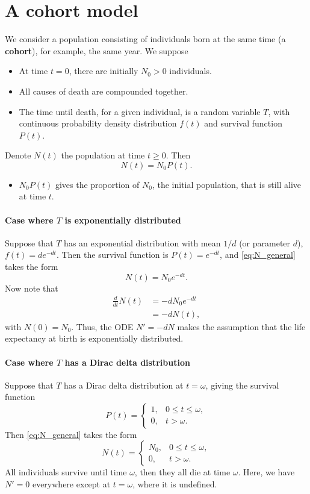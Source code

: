 \section{A cohort model} 
We consider a population consisting of individuals born at the same time (a \textbf{cohort}), for example, the same year.
We suppose
\begin{itemize}
\item At time $t=0$, there are initially $N_0>0$ individuals.
\item All causes of death are compounded together. 
\item The time until death, for a given individual, is a random variable $T$, with continuous probability density distribution $f(t)$ and survival function $P(t)$.
\end{itemize}
Denote $N(t)$ the population at time $t\geq 0$. Then
\begin{equation}\label{eq:N_general}
N(t)=N_0P(t).
\end{equation}
\begin{itemize}
\item $N_0P(t)$ gives the proportion of $N_0$, the initial population, that is still alive at time $t$.
\end{itemize}

\paragraph{Case where $T$ is exponentially distributed}
Suppose that $T$ has an exponential distribution with mean $1/d$ (or parameter $d$), $f(t)=de^{-dt}$. Then the survival function is $P(t)=e^{-dt}$, and \eqref{eq:N_general} takes the form
\begin{equation}\label{eq:N}
N(t)=N_0e^{-dt}.
\end{equation}
Now note that
\begin{align*}
\frac{d}{dt} N(t) &= -dN_0e^{-dt} \\
&= -dN(t),
\end{align*}
with $N(0)=N_0$.
Thus, the ODE $N'=-dN$ makes the assumption that the life expectancy at birth is exponentially distributed.


\paragraph{Case where $T$ has a Dirac delta distribution}
Suppose that $T$ has a Dirac delta distribution at $t=\omega$, giving the survival function 
\[
P(t)=\begin{cases}
1, & 0\leq t\leq\omega,\\
0, & t>\omega.
\end{cases}
\]
Then \eqref{eq:N_general} takes the form
\begin{equation}\label{eq:N2}
N(t)=\begin{cases}
N_0, & 0\leq t\leq\omega,\\
0, & t>\omega.
\end{cases}
\end{equation}
All individuals survive until time $\omega$, then they all die at time $\omega$.
Here, we have $N'=0$ everywhere except at $t=\omega$, where it is undefined.



